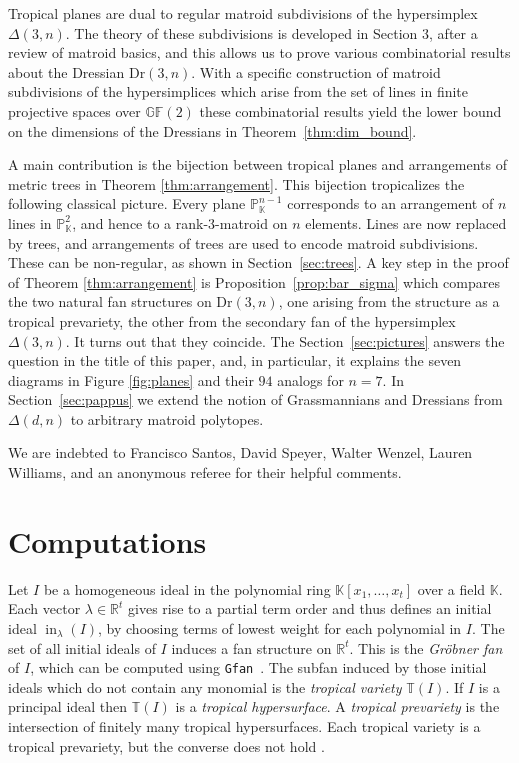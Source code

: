 \documentclass[12pt,a4paper]{amsart}
\theoremstyle{definition}
\newcommand{\K}{{\mathbb{K}}}
\newcommand{\R}{{\mathbb{R}}}
\newcommand{\PP}{{\mathbb{P}}}
\newcommand{\Dr}{{\mathrm{Dr}}}
\providecommand\Gfan{\texttt{Gfan}\xspace}
\providecommand{\GF}{{\mathbb{GF}}}
\DeclareMathOperator{\initial}{in}
\providecommand{\tropical}[1]{{\mathbb{T}}(#1)}
\begin{document}
Tropical planes are dual to regular matroid subdivisions of the hypersimplex
$\Delta(3,n)$. The theory of these subdivisions is developed in Section 3,
after a review of matroid basics, and this allows us to prove various
combinatorial results about the Dressian $\Dr(3,n)$.  With a specific
construction of matroid subdivisions of the hypersimplices which arise from
the set of lines in finite projective spaces over $\GF(2)$ these combinatorial
results yield the lower bound on the dimensions of the Dressians in
Theorem~\ref{thm:dim_bound}.

A main contribution is the bijection between tropical planes and arrangements
of metric trees in Theorem \ref{thm:arrangement}.  This bijection tropicalizes
the following classical picture.  Every plane $\PP_\K^{n-1}$ corresponds to an
arrangement of $n$ lines in $\PP_\K^2$, and hence to a rank-$3$-matroid on $n$
elements.  Lines are now replaced by trees, and arrangements of trees are used
to encode matroid subdivisions.  These can be non-regular, as shown in
Section~\ref{sec:trees}.  A key step in the proof of Theorem
\ref{thm:arrangement} is Proposition~\ref{prop:bar_sigma} which compares the
two natural fan structures on $\Dr(3,n)$, one arising from the structure as a
tropical prevariety, the other from the secondary fan of the hypersimplex
$\Delta(3,n)$.  It turns out that they coincide.  The
Section~\ref{sec:pictures} answers the question in the title of this paper,
and, in particular, it explains the seven diagrams in Figure \ref{fig:planes}
and their $94$ analogs for $n=7$.  In Section~\ref{sec:pappus} we extend the
notion of Grassmannians and Dressians from $\Delta(d,n)$ to arbitrary matroid
polytopes.

We are indebted to Francisco Santos, David Speyer, Walter Wenzel, Lauren
Williams, and an anonymous referee for their helpful comments.

\section{Computations}\label{sec:computation}

Let $I$ be a homogeneous ideal in the polynomial ring
$\K[x_1,\dots,x_t]$ over a field $\K$. Each vector $\lambda\in\R^t$
gives rise to a partial term order and thus defines an initial ideal
$\initial_\lambda(I)$, by choosing terms of lowest weight for each
polynomial in $I$.  The set of all initial ideals of $I$ induces a fan
structure on $\R^t$. This is the \emph{Gr\"obner fan} of $I$, which
can be computed using \Gfan~\cite{Gfan}.  The subfan induced by those
initial ideals which do not contain any monomial is the \emph{tropical
  variety} $\tropical{I}$.  If $I$ is a principal ideal then
$\tropical{I}$ is a \emph{tropical hypersurface}.  A \emph{tropical
  prevariety} is the intersection of finitely many tropical
hypersurfaces.  Each tropical variety is a tropical prevariety, but
the converse does not hold \cite[Lemma~3.7]{RGST}.
\end{document}
